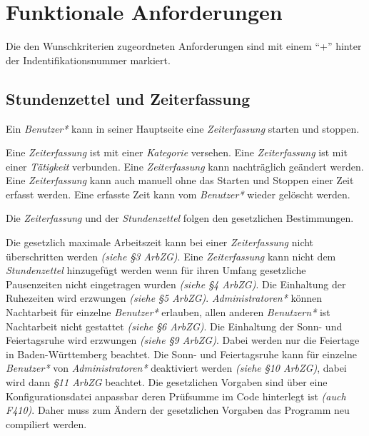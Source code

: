 \section{Funktionale Anforderungen}

Die den Wunschkriterien zugeordneten Anforderungen sind mit einem "`+"' hinter der Indentifikationsnummer markiert.

\subsection{Stundenzettel und Zeiterfassung}

\begin{requirements}
    Ein \emph{Benutzer*} kann in seiner Hauptseite eine \emph{Zeiterfassung} starten und stoppen.
    \begin{requirements}
         Eine \emph{Zeiterfassung} ist mit einer \emph{Kategorie} versehen.
         Eine \emph{Zeiterfassung} ist mit einer \emph{Tätigkeit} verbunden.
         Eine \emph{Zeiterfassung} kann nachträglich geändert werden.
         Eine \emph{Zeiterfassung} kann auch manuell ohne das Starten und Stoppen einer Zeit erfasst werden.
         Eine erfasste Zeit kann vom \emph{Benutzer*} wieder gelöscht werden.
    \end{requirements}

    Die \emph{Zeiterfassung} und der \emph{Stundenzettel} folgen den gesetzlichen Bestimmungen.
    \begin{requirements}
         Die gesetzlich maximale Arbeitszeit kann bei einer \emph{Zeiterfassung} nicht überschritten werden \emph{(siehe §3 ArbZG)}.
         Eine \emph{Zeiterfassung} kann nicht dem \emph{Stundenzettel} hinzugefügt werden wenn für ihren Umfang gesetzliche Pausenzeiten nicht eingetragen wurden \emph{(siehe §4 ArbZG)}.
         Die Einhaltung der Ruhezeiten wird erzwungen \emph{(siehe §5 ArbZG)}.
         \emph{Administratoren*} können Nachtarbeit für einzelne \emph{Benutzer*} erlauben, allen anderen \emph{Benutzern*} ist Nachtarbeit nicht gestattet \emph{(siehe §6 ArbZG)}.
         Die Einhaltung der Sonn- und Feiertagsruhe wird erzwungen \emph{(siehe §9 ArbZG)}.
                Dabei werden nur die Feiertage in Baden-Württemberg beachtet.
                Die Sonn- und Feiertagsruhe kann für einzelne \emph{Benutzer*} von \emph{Administratoren*} deaktiviert werden \emph{(siehe §10 ArbZG)}, dabei wird dann \emph{§11 ArbZG} beachtet.
         Die gesetzlichen Vorgaben sind über eine Konfigurationsdatei anpassbar deren Prüfsumme im Code hinterlegt ist \emph{(auch F410)}.
                Daher muss zum Ändern der gesetzlichen Vorgaben das Programm neu compiliert werden.
    \end{requirements}


\end{requirements}
